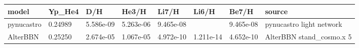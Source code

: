 \begin{tabular}{llllllll}
\toprule
model & Yp_He4 & D/H & He3/H & Li7/H & Li6/H & Be7/H & source \\
\midrule
pynucastro & 0.24989 & 5.586e-09 & 5.263e-06 & 9.465e-08 &  & 9.465e-08 & pynucastro light network \\
AlterBBN & 0.25250 & 2.674e-05 & 1.067e-05 & 4.972e-10 & 1.211e-14 & 4.652e-10 & AlterBBN stand_cosmo.x 5 \\
\bottomrule
\end{tabular}

